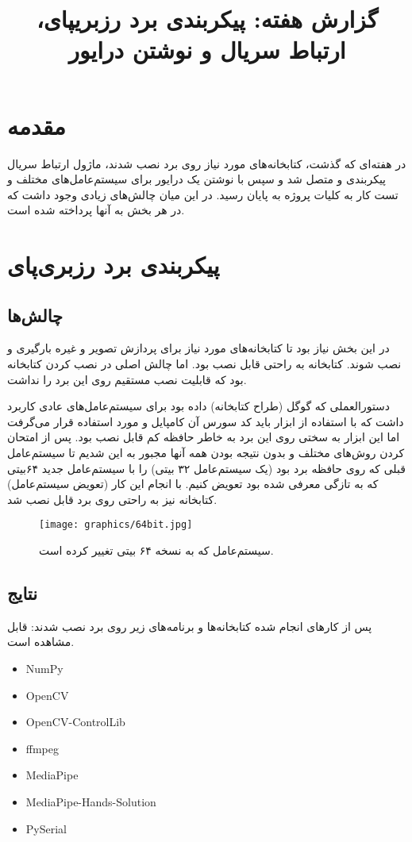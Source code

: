 \documentclass{article}
\title{گزارش هفته: پیکربندی برد رزبریپای، ارتباط سریال و نوشتن درایور}
\begin{document}
\heading
\header
\allowdisplaybreaks
\tableofcontents
\pagebreak

\section{مقدمه}
در هفته‌ای که گذشت، کتابخانه‌های مورد نیاز روی برد  نصب شدند، ماژول ارتباط سریال پیکربندی و متصل شد 
و سپس با نوشتن یک درایور برای سیستم‌عامل‌های مختلف و تست کار به کلیات پروژه به پایان رسید. در این میان چالش‌های زیادی
وجود داشت که در هر بخش به آنها پرداخته شده است.

\section{پیکربندی برد رزبری‌پای}
\subsection{چالش‌ها}
در این بخش نیاز بود تا کتابخانه‌های مورد نیاز برای پردازش تصویر و غیره بارگیری و نصب شوند. کتابخانه  به راحتی
قابل نصب بود. اما چالش اصلی در نصب کردن کتابخانه  بود که قابلیت نصب مستقیم روی این برد را نداشت.

دستورالعملی که گوگل (طراح کتابخانه) داده بود برای سیستم‌عامل‌های عادی کاربرد داشت که با استفاده از ابزار  باید کد سورس آن
کامپایل و مورد استفاده قرار می‌گرفت اما این ابزار به سختی روی این برد به خاطر حافظه کم قابل نصب بود. پس از امتحان کردن روش‌های مختلف
و بدون نتیجه بودن همه آنها مجبور به این شدیم تا سیستم‌عامل قبلی که روی حافظه برد بود (یک سیستم‌عامل ۳۲ بیتی) را با سیستم‌عامل جدید ۶۴بیتی
که به تازگی معرفی شده بود تعویض کنیم. با انجام این کار  (تعویض سیستم‌عامل) کتابخانه  نیز به راحتی روی برد قابل نصب شد.

\begin{figure}
    \centering
    \texttt{[image: graphics/64bit.jpg]}
    \caption{سیستم‌عامل که به نسخه ۶۴ بیتی تغییر کرده است.}
    \label{64bit}
\end{figure}

\subsection{نتایج}
پس از کارهای انجام شده کتابخانه‌ها و برنامه‌های زیر روی برد نصب شدند:
قابل مشاهده است.

\begin{latin}
    \begin{itemize}
        \item NumPy
        \item OpenCV
        \item OpenCV-ControlLib
        \item ffmpeg
        \item MediaPipe
        \item MediaPipe-Hands-Solution
        \item PySerial
    \end{itemize}
\end{latin}
 
\end{document}
